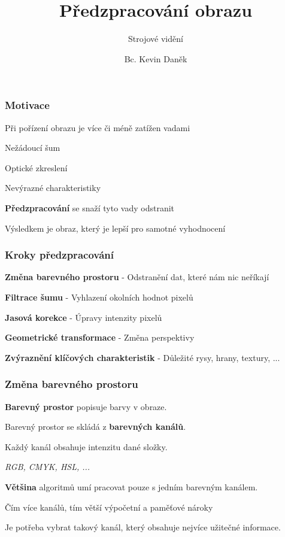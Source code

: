 \documentclass[FM]{tulpresentation}
\title{Předzpracování obrazu}
\subtitle{Strojové vidění}
\author{Bc. Kevin Daněk}
\begin{document}
	
	\TULtitleframe
	
	\begin{frame}
		\frametitle{Motivace}
	    \begin{items}
	      \item Při pořízení obrazu je více či méně zatížen vadami
	      \begin{items}
	      	\item Nežádoucí šum
	      	\item Optické zkreslení
	      	\item Nevýrazné charakteristiky
	      \end{items}
	      \item \textbf{Předzpracování} se snaží tyto vady odstranit
	      \begin{items}
	      	\item Výsledkem je obraz, který je lepší pro samotné vyhodnocení
	      \end{items}
	    \end{items}
	\end{frame}
	
	\begin{frame}
		\frametitle{Kroky předzpracování}
		\begin{items}
			\item \textbf{Změna barevného prostoru} - Odstranění dat, které nám nic neříkají
			\item \textbf{Filtrace šumu} - Vyhlazení okolních hodnot pixelů
			\item \textbf{Jasová korekce} - Úpravy intenzity pixelů
			\item \textbf{Geometrické transformace} - Změna perspektivy
			\item \textbf{Zvýraznění klíčových charakteristik} - Důležité rysy, hrany, textury, ...
		\end{items}
	\end{frame}
	
	\begin{frame}
		\frametitle{Změna barevného prostoru}
		\begin{items}
			\item \textbf{Barevný prostor} popisuje barvy v obraze.
			\item Barevný prostor se skládá z \textbf{barevných kanálů}.
			\begin{items}
				\item Každý kanál obsahuje intenzitu dané složky.
				\item \textit{RGB, CMYK, HSL, ...}
			\end{items}
			\item \textbf{Většina} algoritmů umí pracovat pouze s jedním barevným kanálem.
			\begin{items}
				\item Čím více kanálů, tím větší výpočetní a paměťové nároky
			\end{items}
			\item Je potřeba vybrat takový kanál, který obsahuje nejvíce užitečné informace.
		\end{items}
	\end{frame}
	
\end{document}
